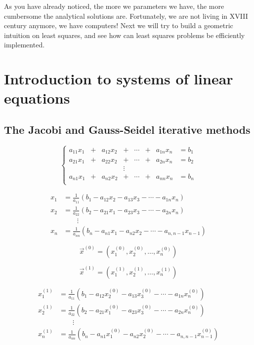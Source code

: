 \documentclass[notitlepage]{report}
\begin{document}
As you have already noticed, the more we parameters we have, the more cumbersome the analytical solutions are.
Fortunately, we are not living in XVIII century anymore, we have computers!
Next we will try to build a geometric intuition on least squares, and see how can least squares problems be efficiently implemented.


\chapter{Introduction to systems of linear equations}
\section{The Jacobi and Gauss-Seidel iterative methods}
$$
\left\{
\begin{array}{cccccccc}
a_{11}x_1 & + &  a_{12}x_2  &+      & \cdots & + & a_{1n}x_n &= b_1\\
a_{21}x_1 & + &  a_{22}x_2  &+      & \cdots & + & a_{2n}x_n &= b_2\\
          &   &             &\vdots &        &   &           &     \\
a_{n1}x_1 & + &  a_{n2}x_2  &+      & \cdots & + & a_{nn}x_n &= b_n\\
\end{array}
\right.
$$

\begin{align*}
x_1 &= \frac{1}{a_{11}}(b_1 - a_{12}x_2 - a_{13}x_3 - \cdots - a_{1n}x_n)\\
x_2 &= \frac{1}{a_{22}}(b_2 - a_{21}x_1 - a_{23}x_3 - \cdots - a_{2n}x_n)\\
    & \qquad \vdots \\
x_n &= \frac{1}{a_{nn}}(b_n - a_{n1}x_1 - a_{n2}x_2 - \cdots - a_{n,n-1}x_{n-1})
\end{align*}

$$\vec{x}^{(0)}=\left(x_1^{(0)}, x_2^{(0)}, \dots, x_n^{(0)}\right)$$

$$\vec{x}^{(1)}=\left(x_1^{(1)}, x_2^{(1)}, \dots, x_n^{(1)}\right)$$

\begin{align*}
x_1^{(1)} &= \frac{1}{a_{11}}(b_1 - a_{12}x_2^{(0)} - a_{13}x_3^{(0)} - \cdots - a_{1n}x_n^{(0)})\\
x_2^{(1)} &= \frac{1}{a_{22}}(b_2 - a_{21}x_1^{(0)} - a_{23}x_3^{(0)} - \cdots - a_{2n}x_n^{(0)})\\
    & \qquad \vdots \\                                                                          
x_n^{(1)} &= \frac{1}{a_{nn}}(b_n - a_{n1}x_1^{(0)} - a_{n2}x_2^{(0)} - \cdots - a_{n,n-1}x_{n-1}^{(0)})
\end{align*}
\end{document}
